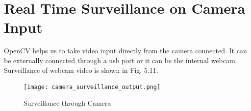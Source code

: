 \section{Real Time Surveillance on Camera Input}
OpenCV helps us to take video input directly from the camera connected. It can be externally connected through a usb port or it can be the internal webcam. Surveillance of webcam video is shown in Fig. 5.11.
\begin{figure}[H]
\centering
\texttt{[image: camera\_surveillance\_output.png]}
\caption{Surveillance through Camera}
\end{figure}

